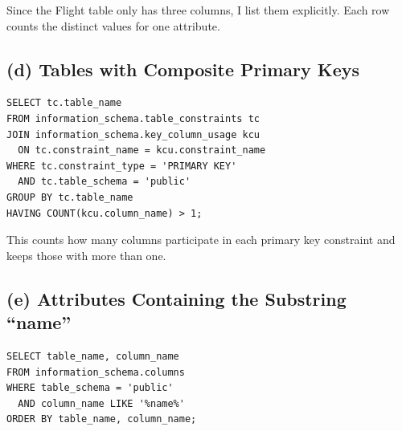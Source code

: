\documentclass[11pt]{article}
\begin{document}
Since the Flight table only has three columns, I list them explicitly. Each row counts the distinct values for one attribute.

\subsection{(d) Tables with Composite Primary Keys}

\begin{lstlisting}
SELECT tc.table_name
FROM information_schema.table_constraints tc
JOIN information_schema.key_column_usage kcu
  ON tc.constraint_name = kcu.constraint_name
WHERE tc.constraint_type = 'PRIMARY KEY'
  AND tc.table_schema = 'public'
GROUP BY tc.table_name
HAVING COUNT(kcu.column_name) > 1;
\end{lstlisting}

This counts how many columns participate in each primary key constraint and keeps those with more than one.

\subsection{(e) Attributes Containing the Substring ``name''}

\begin{lstlisting}
SELECT table_name, column_name
FROM information_schema.columns
WHERE table_schema = 'public'
  AND column_name LIKE '%name%'
ORDER BY table_name, column_name;
\end{lstlisting}
\end{document}
